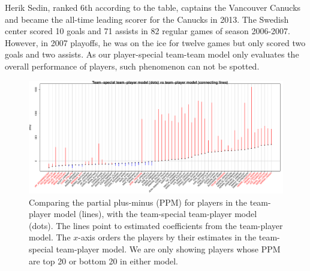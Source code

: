 Herik Sedin, ranked 6th according to the table, captains the Vancouver Canucks and became the all-time leading scorer for the Canucks in 2013. The Swedish center scored 10 goals and 71 assists in 82 regular games of season 2006-2007. However, in 2007 playoffs, he was on the ice for twelve games but only scored two goals and two assists. As our player-special team-team model only evaluates the overall performance of players, such phenomenon can not be spotted. 

\begin{figure}[htb!]
	\centering
	\includegraphics[width=\textwidth]{figures/ptsvspt_tb20.pdf}
	\caption{Comparing the partial plus-minus (PPM) for players in the team-player model (lines), with the team-special team-player model (dots). The lines point to estimated coefficients from the team-player model. The $x$-axis orders the players by their estimates in the team-special team-player model. We are only showing players whose PPM are top 20 or bottom 20 in either model.}\label{fig:pts-pt.tb20}
\end{figure}

